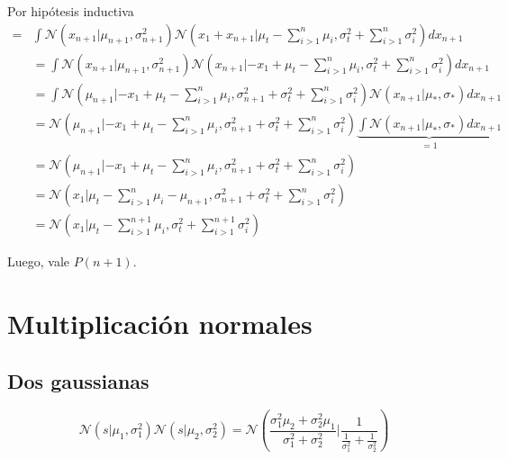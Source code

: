 \documentclass[11pt,twoside,spanish]{report} %
\begin{document}
Por hip\'otesis inductiva
\begin{equation}
	\begin{split}
		=&\int \mathcal{N}(x_{n+1}|\mu_{n+1},\sigma_{n+1}^2) \mathcal{N}\left(x_1+x_{n+1}|\mu_t-\sum_{i>1}^n \mu_i,\sigma_t^2+\sum_{i>1}^n\sigma_i^2\right) dx_{n+1} \\
		&=\int \mathcal{N}(x_{n+1}|\mu_{n+1},\sigma_{n+1}^2) \mathcal{N}\left(x_{n+1}|-x_1+\mu_t-\sum_{i>1}^n \mu_i,\sigma_t^2+\sum_{i>1}^n\sigma_i^2\right) dx_{n+1} \\
		&=\int \mathcal{N}(\mu_{n+1}|-x_1+\mu_t-\sum_{i>1}^n \mu_i,\sigma_{n+1}^2+\sigma_t^2+\sum_{i>1}^n\sigma_i^2) \mathcal{N}\left(x_{n+1}|\mu_{\ast},\sigma_{\ast}\right) dx_{n+1} \\
		&= \mathcal{N}(\mu_{n+1}|-x_1+\mu_t-\sum_{i>1}^n \mu_i,\sigma_{n+1}^2+\sigma_t^2+\sum_{i>1}^n\sigma_i^2) \underbrace{\int \mathcal{N}\left(x_{n+1}|\mu_{\ast},\sigma_{\ast}\right) dx_{n+1}}_{=1} \\
		&= \mathcal{N}(\mu_{n+1}|-x_1+\mu_t-\sum_{i>1}^n \mu_i,\sigma_{n+1}^2+\sigma_t^2+\sum_{i>1}^n\sigma_i^2)\\
		&= \mathcal{N}(x_1|\mu_t-\sum_{i>1}^n \mu_i-\mu_{n+1},\sigma_{n+1}^2+\sigma_t^2+\sum_{i>1}^n\sigma_i^2)\\
		&= \mathcal{N}(x_1|\mu_t-\sum_{i>1}^{n+1} \mu_i,\sigma_t^2+\sum_{i>1}^{n+1}\sigma_i^2)
	\end{split}
\end{equation}


Luego, vale $P(n+1)$.


\section{Multiplicaci\'on normales}



\subsection{Dos gaussianas}

\begin{equation}\mathcal{N}(s \vert \mu_1,\sigma_1^2) \mathcal{N}(s \vert \mu_2,\sigma_2^2) = \mathcal{N}\left(\frac{\sigma_1^2\mu_2+\sigma_2^2\mu_1}{\sigma_1^2 + \sigma_2^2} \Bigg\vert \frac{1}{\frac{1}{\sigma_1^2}+\frac{1}{\sigma_2^2}}\right) 
\end{equation}
\end{document}
